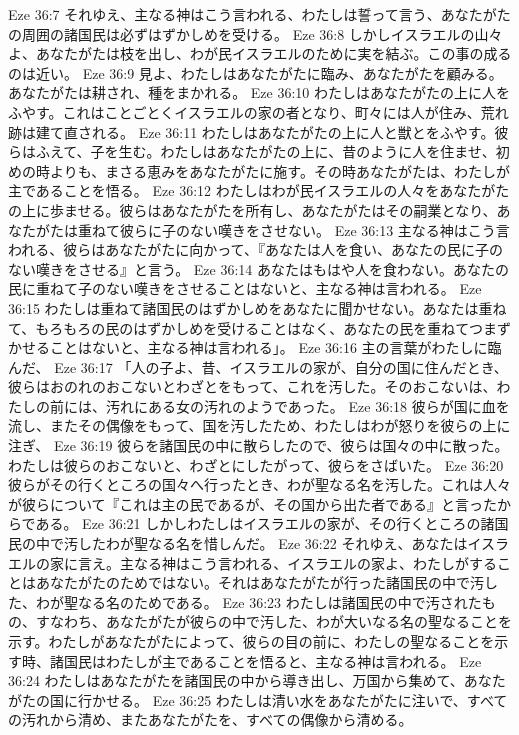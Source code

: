 Eze 36:7  それゆえ、主なる神はこう言われる、わたしは誓って言う、あなたがたの周囲の諸国民は必ずはずかしめを受ける。
Eze 36:8  しかしイスラエルの山々よ、あなたがたは枝を出し、わが民イスラエルのために実を結ぶ。この事の成るのは近い。
Eze 36:9  見よ、わたしはあなたがたに臨み、あなたがたを顧みる。あなたがたは耕され、種をまかれる。
Eze 36:10  わたしはあなたがたの上に人をふやす。これはことごとくイスラエルの家の者となり、町々には人が住み、荒れ跡は建て直される。
Eze 36:11  わたしはあなたがたの上に人と獣とをふやす。彼らはふえて、子を生む。わたしはあなたがたの上に、昔のように人を住ませ、初めの時よりも、まさる恵みをあなたがたに施す。その時あなたがたは、わたしが主であることを悟る。
Eze 36:12  わたしはわが民イスラエルの人々をあなたがたの上に歩ませる。彼らはあなたがたを所有し、あなたがたはその嗣業となり、あなたがたは重ねて彼らに子のない嘆きをさせない。
Eze 36:13  主なる神はこう言われる、彼らはあなたがたに向かって、『あなたは人を食い、あなたの民に子のない嘆きをさせる』と言う。
Eze 36:14  あなたはもはや人を食わない。あなたの民に重ねて子のない嘆きをさせることはないと、主なる神は言われる。
Eze 36:15  わたしは重ねて諸国民のはずかしめをあなたに聞かせない。あなたは重ねて、もろもろの民のはずかしめを受けることはなく、あなたの民を重ねてつまずかせることはないと、主なる神は言われる」。
Eze 36:16  主の言葉がわたしに臨んだ、
Eze 36:17  「人の子よ、昔、イスラエルの家が、自分の国に住んだとき、彼らはおのれのおこないとわざとをもって、これを汚した。そのおこないは、わたしの前には、汚れにある女の汚れのようであった。
Eze 36:18  彼らが国に血を流し、またその偶像をもって、国を汚したため、わたしはわが怒りを彼らの上に注ぎ、
Eze 36:19  彼らを諸国民の中に散らしたので、彼らは国々の中に散った。わたしは彼らのおこないと、わざとにしたがって、彼らをさばいた。
Eze 36:20  彼らがその行くところの国々へ行ったとき、わが聖なる名を汚した。これは人々が彼らについて『これは主の民であるが、その国から出た者である』と言ったからである。
Eze 36:21  しかしわたしはイスラエルの家が、その行くところの諸国民の中で汚したわが聖なる名を惜しんだ。
Eze 36:22  それゆえ、あなたはイスラエルの家に言え。主なる神はこう言われる、イスラエルの家よ、わたしがすることはあなたがたのためではない。それはあなたがたが行った諸国民の中で汚した、わが聖なる名のためである。
Eze 36:23  わたしは諸国民の中で汚されたもの、すなわち、あなたがたが彼らの中で汚した、わが大いなる名の聖なることを示す。わたしがあなたがたによって、彼らの目の前に、わたしの聖なることを示す時、諸国民はわたしが主であることを悟ると、主なる神は言われる。
Eze 36:24  わたしはあなたがたを諸国民の中から導き出し、万国から集めて、あなたがたの国に行かせる。
Eze 36:25  わたしは清い水をあなたがたに注いで、すべての汚れから清め、またあなたがたを、すべての偶像から清める。
